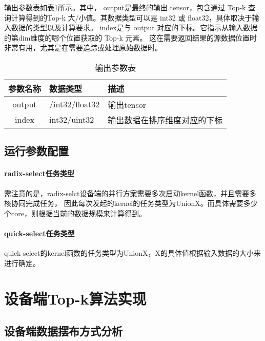     输出参数表如表\ref{tab:output_tab}所示。其中，
    output是最终的输出 tensor，包含通过 Top-k 查询计算得到的Top-k 大/小值。其数据类型可以是 int32 或 float32，具体取决于输入数据的类型以及计算要求。
    index是与 output 对应的下标。它指示从输入数据的第dim维度的哪个位置获取的 Top-k 元素。
    这在需要返回结果的源数据位置时非常有用，尤其是在需要追踪或处理原始数据时。
    \begin{table}
        \centering
        \caption{输出参数表}
        \label{tab:output_tab}
        \begin{tabular}{cll} %
          \toprule
          参数名称   & 数据类型                                       & 描述                          \\
          \midrule
          output & /int32/float32 & 输出tensor                 \\
          index   & int32/uint32   & 输出数据在排序维度对应的下标              \\
          \bottomrule
        \end{tabular}
    \end{table}
    

    \subsection{运行参数配置}

        \paragraph{radix-select任务类型}
            需注意的是，radix-selct设备端的并行方案需要多次启动kernel函数，并且需要多核协同完成任务，
            因此每次发起的kernel的任务类型为UnionX。而具体需要多少个core，则根据当前的数据规模来计算得到。
            


        \paragraph{quick-select任务类型}
            quick-select的kernel函数的任务类型为UnionX，X的具体值根据输入数据的大小来进行确定。



\section{设备端Top-k算法实现}
    \subsection{设备端数据摆布方式分析}


